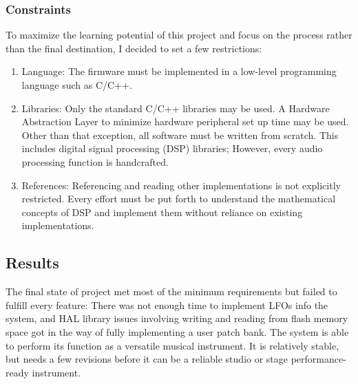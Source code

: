 \documentclass[acmlarge,screen]{acmart}
\begin{document}
	
	\subsubsection{Constraints}
	To maximize the learning potential of this project and focus on the process rather than the final destination, I decided to set a few restrictions:
	\begin{enumerate}
		\item Language: The firmware must be implemented in a low-level programming language such as C/C++.
		\item Libraries: Only the standard C/C++ libraries may be used. A Hardware Abstraction Layer to minimize hardware peripheral set up time may be used. Other than that exception, all software must be written from scratch. This includes digital signal processing (DSP) libraries; However, every audio processing function is handcrafted.
		\item References: Referencing and reading other implementations is not explicitly restricted. Every effort must be put forth to understand the mathematical concepts of DSP and implement them without reliance on existing implementations.
	\end{enumerate}
	
\subsection{Results}
	The final state of project met most of the minimum requirements but failed to fulfill every feature: There was not enough time to implement LFOs info the system, and HAL library issues involving writing and reading from flash memory space got in the way of fully implementing a user patch bank. The system is able to perform its function as a versatile musical instrument. It is relatively stable, but needs a few revisions before it can be a reliable studio or stage performance-ready instrument.
	
\end{document}
